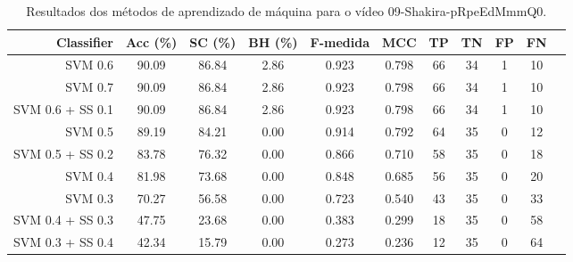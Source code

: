 \begin{table}[!htb]
\centering
\caption{Resultados dos métodos de aprendizado de máquina para o vídeo 09-Shakira-pRpeEdMmmQ0.}
\label{tab:09-Shakira-pRpeEdMmmQ0}
\begin{tabular}{r|c|c|c|c|c|c|c|c|c|c}
\hline\hline
Classifier & Acc (\%) & SC (\%) & BH (\%) & F-medida & MCC & TP & TN & FP & FN \\ \hline
SVM 0.6 & 90.09 & 86.84 & 2.86 & 0.923 & 0.798 & 66 & 34 & 1 & 10 \\ 
SVM 0.7 & 90.09 & 86.84 & 2.86 & 0.923 & 0.798 & 66 & 34 & 1 & 10 \\ 
SVM 0.6 + SS 0.1 & 90.09 & 86.84 & 2.86 & 0.923 & 0.798 & 66 & 34 & 1 & 10 \\ 
SVM 0.5 & 89.19 & 84.21 & 0.00 & 0.914 & 0.792 & 64 & 35 & 0 & 12 \\ 
SVM 0.5 + SS 0.2 & 83.78 & 76.32 & 0.00 & 0.866 & 0.710 & 58 & 35 & 0 & 18 \\ 
SVM 0.4 & 81.98 & 73.68 & 0.00 & 0.848 & 0.685 & 56 & 35 & 0 & 20 \\ 
SVM 0.3 & 70.27 & 56.58 & 0.00 & 0.723 & 0.540 & 43 & 35 & 0 & 33 \\ 
SVM 0.4 + SS 0.3 & 47.75 & 23.68 & 0.00 & 0.383 & 0.299 & 18 & 35 & 0 & 58 \\ 
SVM 0.3 + SS 0.4 & 42.34 & 15.79 & 0.00 & 0.273 & 0.236 & 12 & 35 & 0 & 64 \\ 
\hline\hline
\end{tabular}
\end{table}

